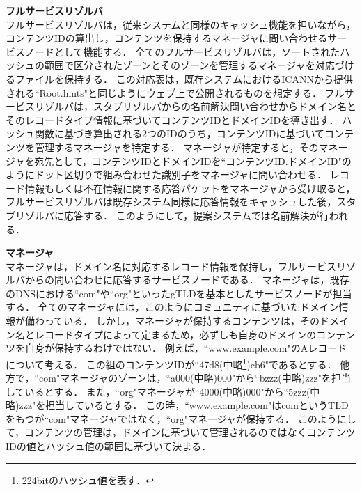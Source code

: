 \hspace{-12pt}\textbf{フルサービスリゾルバ}\\
\hspace{12pt}フルサービスリゾルバは，従来システムと同様のキャッシュ機能を担いながら，コンテンツIDの算出し，コンテンツを保持するマネージャに問い合わせるサービスノードとして機能する．
全てのフルサービスリゾルバは，ソートされたハッシュの範囲で区分されたゾーンとそのゾーンを管理するマネージャを対応づけるファイルを保持する．
この対応表は，既存システムにおけるICANNから提供される``Root.hints"と同じようにウェブ上で公開されるものを想定する．
フルサービスリゾルバは，スタブリゾルバからの名前解決問い合わせからドメイン名とそのレコードタイプ情報に基づいてコンテンツIDとドメインIDを導き出す．
ハッシュ関数に基づき算出される2つのIDのうち，コンテンツIDに基づいてコンテンツを管理するマネージャを特定する．
マネージャが特定すると，そのマネージャを宛先として，コンテンツIDとドメインIDを``コンテンツID.ドメインID"のようにドット区切りで組み合わせた識別子をマネージャに問い合わせる．
レコード情報もしくは不在情報に関する応答パケットをマネージャから受け取ると，フルサービスリゾルバは既存システム同様に応答情報をキャッシュした後，スタブリゾルバに応答する．
このようにして，提案システムでは名前解決が行われる．


\newpage
\hspace{-12pt}\textbf{マネージャ}\\
\hspace{12pt} マネージャは，ドメイン名に対応するレコード情報を保持し，フルサービスリゾルバからの問い合わせに応答するサービスノードである．
マネージャは，既存のDNSにおける``com"や``org"といったgTLDを基本としたサービスノードが担当する．
全てのマネージャには，このようにコミュニティに基づいたドメイン情報が備わっている．
しかし，マネージャが保持するコンテンツは，そのドメイン名とレコードタイプによって定まるため，必ずしも自身のドメインのコンテンツを自身が保持するわけではない．
例えば，``www.example.com"のAレコードについて考える．
この組のコンテンツIDが``47d8(中略\footnote{224bitのハッシュ値を表す．})cb6"であるとする．
他方で，``com"マネージャのゾーンは，``a000(中略)000"から``bzzz(中略)zzz"を担当しているとする．
また，``org"マネージャが``4000(中略)000"から``5zzz(中略)zzz"を担当しているとする．
この時，``www.example.com"はcomというTLDをもつが``com"マネージャではなく，``org"マネージャが保持する．
このようにして，コンテンツの管理は，ドメインに基づいて管理されるのではなくコンテンツIDの値とハッシュ値の範囲に基づいて決まる．



